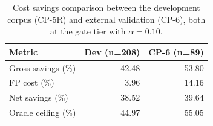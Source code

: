 \begin{table}[htbp]
\centering
\caption{Cost savings comparison between the development corpus (CP-5R) and external validation (CP-6), both at the gate tier with $\alpha = 0.10$.}
\label{tab:cost_comparison}
\small
\begin{tabular}{lrr}
\toprule
Metric & Dev (n=208) & CP-6 (n=89) \\
\midrule
Gross savings (\%) & 42.48 & 53.80 \\
FP cost (\%) & 3.96 & 14.16 \\
Net savings (\%) & 38.52 & 39.64 \\
Oracle ceiling (\%) & 44.97 & 55.05 \\
\bottomrule
\end{tabular}
\end{table}